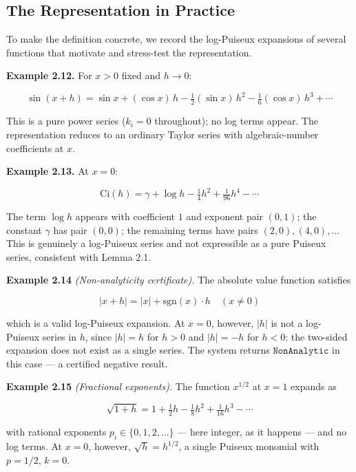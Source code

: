 \documentclass[12pt]{article}
\begin{document}
\subsection{The Representation in
Practice}\label{the-representation-in-practice}

To make the definition concrete, we record the log-Puiseux expansions of
several functions that motivate and stress-test the representation.

\textbf{Example 2.12.} For \(x > 0\) fixed and \(h \to 0\):

\[\sin(x+h) = \sin x + (\cos x)\, h - \tfrac{1}{2}(\sin x)\, h^2 - \tfrac{1}{6}(\cos x)\, h^3 + \cdots\]

This is a pure power series (\(k_i = 0\) throughout); no log terms
appear. The representation reduces to an ordinary Taylor series with
algebraic-number coefficients at \(x\).

\textbf{Example 2.13.} At \(x = 0\):

\[\mathrm{Ci}(h) = \gamma + \log h - \tfrac{1}{4}h^2 + \tfrac{1}{96}h^4 - \cdots\]

The term \(\log h\) appears with coefficient \(1\) and exponent pair
\((0, 1)\); the constant \(\gamma\) has pair \((0, 0)\); the remaining
terms have pairs \((2,0), (4,0), \ldots\) This is genuinely a
log-Puiseux series and not expressible as a pure Puiseux series,
consistent with Lemma 2.1.

\textbf{Example 2.14} \emph{(Non-analyticity certificate).} The absolute
value function satisfies

\[|x + h| = |x| + \mathrm{sgn}(x) \cdot h \quad (x \neq 0)\]

which is a valid log-Puiseux expansion. At \(x = 0\), however, \(|h|\)
is not a log-Puiseux series in \(h\), since \(|h| = h\) for \(h > 0\)
and \(|h| = -h\) for \(h < 0\): the two-sided expansion does not exist
as a single series. The system returns \(\mathtt{NonAnalytic}\) in this
case --- a certified negative result.

\textbf{Example 2.15} \emph{(Fractional exponents).} The function
\(x^{1/2}\) at \(x = 1\) expands as

\[\sqrt{1+h} = 1 + \tfrac{1}{2}h - \tfrac{1}{8}h^2 + \tfrac{1}{16}h^3 - \cdots\]

with rational exponents \(p_i \in \{0, 1, 2, \ldots\}\) --- here
integer, as it happens --- and no log terms. At \(x = 0\), however,
\(\sqrt{h} = h^{1/2}\), a single Puiseux monomial with \(p = 1/2\),
\(k = 0\).
\end{document}
